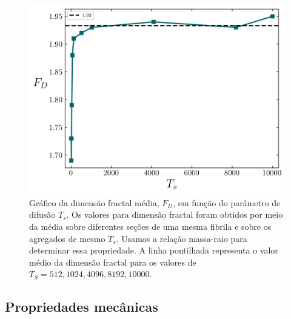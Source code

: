 \documentclass[11pt,a4paper]{article} %
\begin{document}
     
        \begin{figure}[H] 

            \centering 
            \includegraphics[width=\textwidth]{figures/dim_frac.png} 
            \caption{ Gráfico da dimensão fractal média, \(F_{D}\), em função do parâmetro de difusão \(T_{s}\). Os valores para  
            dimensão fractal foram obtidos por meio da média sobre diferentes seções de uma mesma fibrila e sobre os agregados 
            de mesmo \(T_{s}\). Usamos a relação massa-raio para determinar essa propriedade. A linha pontilhada representa  
            o valor médio da dimensão fractal para os valores de \(T_{S}=512,1024,4096,8192,10000\).}  
            \label{R4} 

        \end{figure} 

 
        \subsection{Propriedades mecânicas} 
\end{document}
